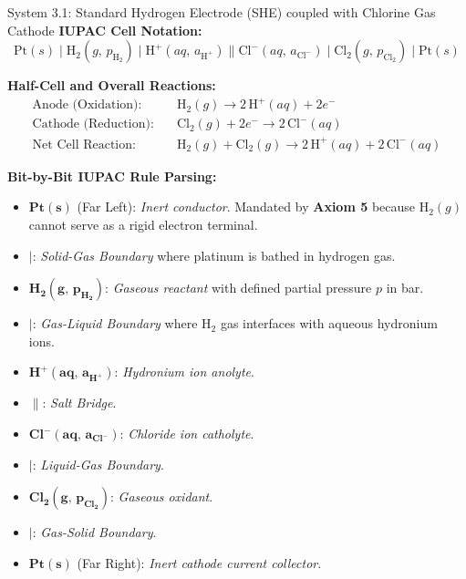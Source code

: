 \documentclass[10pt,a4paper]{article}
\begin{document}
\begin{examplebox}{System 3.1: Standard Hydrogen Electrode (SHE) coupled with Chlorine Gas Cathode}
\textbf{IUPAC Cell Notation:}
\begin{equation*}
    \text{Pt}(s) \mid \text{H}_2(g,\, p_{\text{H}_2}) \mid \text{H}^+(aq,\, a_{\text{H}^+}) \parallel \text{Cl}^-(aq,\, a_{\text{Cl}^-}) \mid \text{Cl}_2(g,\, p_{\text{Cl}_2}) \mid \text{Pt}(s)
\end{equation*}

\textbf{Half-Cell and Overall Reactions:}
\begin{align*}
    \text{Anode (Oxidation):} \quad & \text{H}_2(g) \longrightarrow 2\,\text{H}^+(aq) + 2e^- \\
    \text{Cathode (Reduction):} \quad & \text{Cl}_2(g) + 2e^- \longrightarrow 2\,\text{Cl}^-(aq) \\
    \text{Net Cell Reaction:} \quad & \text{H}_2(g) + \text{Cl}_2(g) \longrightarrow 2\,\text{H}^+(aq) + 2\,\text{Cl}^-(aq)
\end{align*}

\textbf{Bit-by-Bit IUPAC Rule Parsing:}
\begin{itemize}[leftmargin=*]
    \item $\mathbf{Pt(s)}$ (Far Left): \textit{Inert conductor}. Mandated by \textbf{Axiom 5} because $\text{H}_2(g)$ cannot serve as a rigid electron terminal.
    \item $\mathbf{\mid}$: \textit{Solid-Gas Boundary} where platinum is bathed in hydrogen gas.
    \item $\mathbf{H_2(g,\, p_{\text{H}_2})}$: \textit{Gaseous reactant} with defined partial pressure $p$ in bar.
    \item $\mathbf{\mid}$: \textit{Gas-Liquid Boundary} where $\text{H}_2$ gas interfaces with aqueous hydronium ions.
    \item $\mathbf{H^+(aq,\, a_{\text{H}^+})}$: \textit{Hydronium ion anolyte}.
    \item $\mathbf{\parallel}$: \textit{Salt Bridge}.
    \item $\mathbf{Cl^-(aq,\, a_{\text{Cl}^-})}$: \textit{Chloride ion catholyte}.
    \item $\mathbf{\mid}$: \textit{Liquid-Gas Boundary}.
    \item $\mathbf{Cl_2(g,\, p_{\text{Cl}_2})}$: \textit{Gaseous oxidant}.
    \item $\mathbf{\mid}$: \textit{Gas-Solid Boundary}.
    \item $\mathbf{Pt(s)}$ (Far Right): \textit{Inert cathode current collector}.
\end{itemize}
\end{examplebox}
\end{document}

